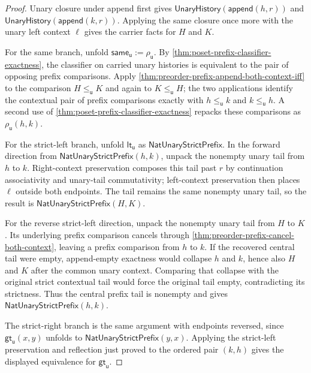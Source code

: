 \begin{proof}
Unary closure under append first gives
$\mathsf{UnaryHistory}(\mathsf{append}(h,r))$ and
$\mathsf{UnaryHistory}(\mathsf{append}(k,r))$. Applying the same closure once
more with the unary left context $\ell$ gives the carrier facts for $H$ and $K$.

For the same branch, unfold
$\mathsf{same}_{\mathsf{u}}:=\rho_{\mathsf{u}}$. By
\autoref{thm:poset-prefix-classifier-exactness}, the classifier on carried
unary histories is equivalent to the pair of opposing prefix comparisons.
Apply \autoref{thm:preorder-prefix-append-both-context-iff} to the comparison
$H\le_{\mathsf{u}}K$ and again to $K\le_{\mathsf{u}}H$; the two applications
identify the contextual pair of prefix comparisons exactly with
$h\le_{\mathsf{u}}k$ and $k\le_{\mathsf{u}}h$. A second use of
\autoref{thm:poset-prefix-classifier-exactness} repacks these comparisons as
$\rho_{\mathsf{u}}(h,k)$.

For the strict-left branch, unfold
$\mathsf{lt}_{\mathsf{u}}$ as
$\mathsf{NatUnaryStrictPrefix}$. In the forward direction from
$\mathsf{NatUnaryStrictPrefix}(h,k)$, unpack the nonempty unary tail from $h$ to
$k$. Right-context preservation composes this tail past $r$ by continuation
associativity and unary-tail commutativity; left-context preservation then
places $\ell$ outside both endpoints. The tail remains the same nonempty unary
tail, so the result is $\mathsf{NatUnaryStrictPrefix}(H,K)$.

For the reverse strict-left direction, unpack the nonempty unary tail from $H$
to $K$. Its underlying prefix comparison cancels through
\autoref{thm:preorder-prefix-cancel-both-context}, leaving a prefix comparison
from $h$ to $k$. If the recovered central tail were empty, append-empty
exactness would collapse $h$ and $k$, hence also $H$ and $K$ after the common
unary context. Comparing that collapse with the original strict contextual tail
would force the original tail empty, contradicting its strictness. Thus the
central prefix tail is nonempty and gives
$\mathsf{NatUnaryStrictPrefix}(h,k)$.

The strict-right branch is the same argument with endpoints reversed, since
$\mathsf{gt}_{\mathsf{u}}(x,y)$ unfolds to
$\mathsf{NatUnaryStrictPrefix}(y,x)$. Applying the strict-left preservation and
reflection just proved to the ordered pair $(k,h)$ gives the displayed
equivalence for $\mathsf{gt}_{\mathsf{u}}$.
\end{proof}

